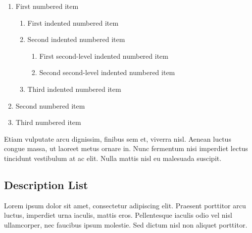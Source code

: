 \documentclass[
	letterpaper, %
	12pt, %
]{CSSullivanBusinessReport}
\begin{document}
\begin{enumerate}
	\item First numbered item
	\begin{enumerate}
		\item First indented numbered item
		\item Second indented numbered item
		\begin{enumerate}
			\item First second-level indented numbered item
			\item Second second-level indented numbered item
		\end{enumerate}
		\item Third indented numbered item
	\end{enumerate}
	\item Second numbered item
	\item Third numbered item
\end{enumerate}

Etiam vulputate arcu dignissim, finibus sem et, viverra nisl. Aenean luctus congue massa, ut laoreet metus ornare in. Nunc fermentum nisi imperdiet lectus tincidunt vestibulum at ac elit. Nulla mattis nisl eu malesuada suscipit.


\subsection{Description List}

Lorem ipsum dolor sit amet, consectetur adipiscing elit. Praesent porttitor arcu luctus, imperdiet urna iaculis, mattis eros. Pellentesque iaculis odio vel nisl ullamcorper, nec faucibus ipsum molestie. Sed dictum nisl non aliquet porttitor.
\end{document}
